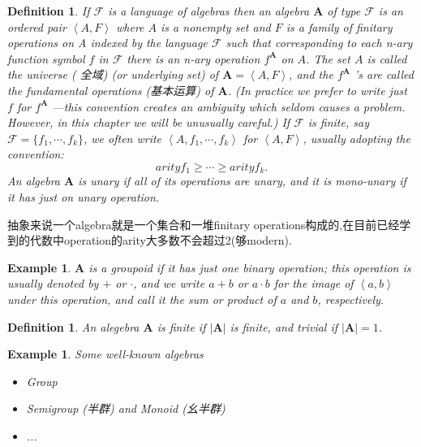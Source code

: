 \documentclass{article}
\newtheorem{example}[theorem]{Example}
\newtheorem{definition}[theorem]{Definition}
\begin{document}
\begin{definition}
\rm If $\mathcal{F}$ is a language of algebras then an {\color{red} algebra} $\mathbf{A}$ of type $\mathcal{F}$ is an ordered pair $\left<A,F\right>$ where $A$ is a {\color{red} nonempty set} and $F$ is a family of {\color{red} finitary operations} on A indexed by the language $\mathcal{F}$ such that corresponding to each n-ary function symbol $f$ in $\mathcal{F}$ there is an n-ary operation $f^\mathbf{A}$ on $A$. The set $A$ is called the {\color{red} universe} ({\color{blue} 全域}) (or underlying set) of $\mathbf{A} =\left<A,F\right>$, and the $f^\mathbf{A}$ ’s are called the {\color{red} fundamental operations} ({\color{blue}基本运算}) of $\mathbf{A}$. (In practice we prefer to write just $f$ for $f ^\mathbf{A}$ —this convention creates an ambiguity which seldom causes a problem. However, in this chapter we will be unusually careful.) If $\mathcal{F}$ is finite, say $\mathcal{F} = \{f_1,\cdots,f_k\}$, we often write $\left<A, f_1,\cdots,f_k\right>$ for $\left<A,F\right>$, usually adopting the convention:
$$
arity f_1 \geq \cdots \geq arity f_k.
$$
An algebra $\mathbf{A}$ is {\color{red} unary} if all of its operations are unary, and it is mono-unary if it has just on unary operation.
\end{definition}

{\color{blue} 抽象来说一个algebra就是一个集合和一堆finitary operations构成的,在目前已经学到的代数中operation的arity大多数不会超过2(够modern).}

\begin{example}
\rm $\mathbf{A}$ is a {\color{red} groupoid} if it has just one binary operation; this operation is usually denoted by $+$ or $\cdot$, and we write $a+b$ or $a \cdot b$ for the image of $\left<a,b\right>$ under this operation, and call it the sum or product of $a$ and $b$, respectively.
\end{example}

\begin{definition}
\rm An alegebra $\mathbf{A}$ is {\color{red} finite} if $|\mathbf{A}|$ is finite, and trivial if $|\mathbf{A}|=1$. 
\end{definition}

\begin{example}
\rm Some well-known algebras
\begin{itemize}
	\item Group
	\item Semigroup (半群) and Monoid (幺半群)
	\item ...
\end{itemize}
\end{example}
\end{document}

